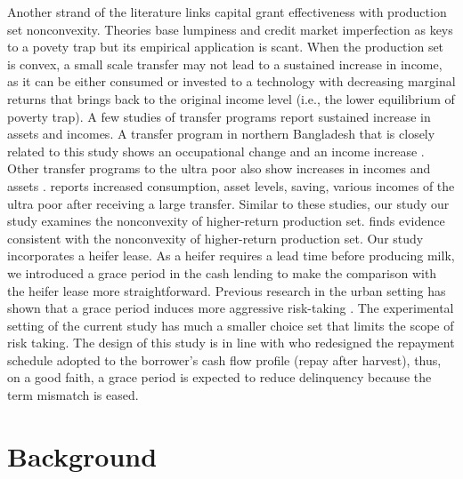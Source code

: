 	Another strand of the literature links capital grant effectiveness with production set nonconvexity. Theories base lumpiness and credit market imperfection as keys to a povety trap \citep[e.g., ][]{GalorZeira1993} but its empirical application is scant. When the production set is convex, a small scale transfer may not lead to a sustained increase in income, as it can be either consumed or invested to a technology with decreasing marginal returns that brings back to the original income level (i.e., the lower equilibrium of poverty trap). A few studies of transfer programs report sustained increase in assets and incomes. A transfer program in northern Bangladesh that is closely related to this study shows an occupational change and an income increase \citep{BandieraBRAC2017}. Other transfer programs to the ultra poor also show increases in incomes and assets \citep{Blattman2014, BanerjeeetalScience2015, Blattmanetal2016, HaushoferShapiro2016}. \citet{BanerjeeetalScience2015} reports increased consumption, asset levels, saving, various incomes of the ultra poor after receiving a large transfer. %
	Similar to these studies, our study our study examines the nonconvexity of higher-return production set.
	finds evidence consistent with the nonconvexity of higher-return production set. Our study incorporates a heifer lease. As a heifer requires a lead time before producing milk, we introduced a grace period in the cash lending to make the comparison with the heifer lease more straightforward. Previous research  in the urban setting has shown that a grace period induces more aggressive risk-taking \citep{Field2013}. %
	The experimental setting of the current study has much a smaller choice set that limits the scope of risk taking. The design of this study is in line with \citet{Beaman2015} who redesigned the repayment schedule adopted to the borrower's cash flow profile (repay after harvest), thus, on a good faith, a grace period is expected to reduce delinquency because the term mismatch is eased. 


\section{Background}
\label{SecBackground}


